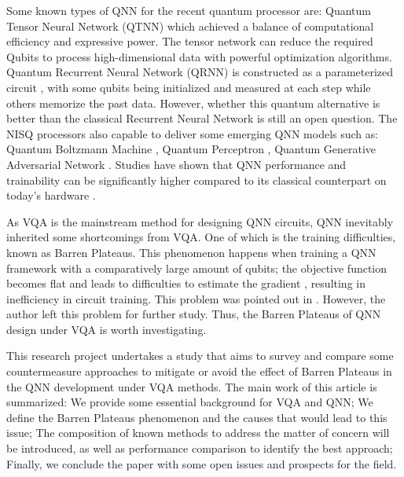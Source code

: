 Some known types of QNN for the recent quantum processor are: 
Quantum Tensor Neural Network (QTNN) \cite{hugginsQuantumMachineLearning2019} which achieved a balance of computational efficiency and expressive power. 
The tensor network can reduce the required Qubits to process high-dimensional data with powerful optimization algorithms.
Quantum Recurrent Neural Network (QRNN) is constructed as a parameterized circuit \cite{takakiLearningTemporalData2021}, with some qubits being initialized and measured at each step while others memorize the past data.
However, whether this quantum alternative is better than the classical Recurrent Neural Network is still an open question.
The NISQ processors also capable to deliver some emerging QNN models such as: 
Quantum Boltzmann Machine \cite{shinguBoltzmannMachineLearning2021}\cite{zoufalVariationalQuantumBoltzmann2021}, 
Quantum Perceptron \cite{kristensenArtificialSpikingQuantum2021}, 
Quantum Generative Adversarial Network \cite{dallaire-demersQuantumGenerativeAdversarial2018}\cite{lloydQuantumGenerativeAdversarial2018}. Studies have shown that QNN performance and trainability can be significantly higher compared to its classical counterpart on today's hardware \cite{abbasPowerQuantumNeural2021, colesSeekingQuantumAdvantage2021}.

As VQA is the mainstream method for designing QNN circuits, QNN inevitably inherited some shortcomings from VQA.
One of which is the training difficulties, known as Barren Plateaus.
This phenomenon happens when training a QNN framework with a comparatively large amount of qubits; the objective function becomes flat and leads to difficulties to estimate the gradient \cite{mccleanBarrenPlateausQuantum2018,zhaoAnalyzingBarrenPlateau2021}, resulting in inefficiency in circuit training. 
This problem was pointed out in \cite{abbasPowerQuantumNeural2021}. 
However, the author left this problem for further study. 
Thus, the Barren Plateaus of QNN design under VQA is worth investigating.

This research project undertakes a study that aims to survey and compare some countermeasure approaches to mitigate or avoid the effect of Barren Plateaus in the QNN development under VQA methods. 
The main work of this article is summarized: 
We provide some essential background for VQA and QNN;
We define the Barren Plateaus phenomenon and the causes that would lead to this issue; 
The composition of known methods to address the matter of concern will be introduced, as well as performance comparison to identify the best approach; 
Finally, we conclude the paper with some open issues and prospects for the field.


